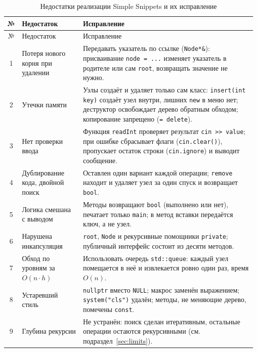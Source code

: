 \documentclass[otchet]{SCWorks}
\begin{document}
\begin{longtable}{|c|p{}|p{}|}
  \caption{Недостатки реализации Simple Snippets и их исправление}
  \label{tab:fixes} \\
  \hline
  № & Недостаток & Исправление \\ \hline
  \endfirsthead
  \hline
  № & Недостаток & Исправление \\ \hline
  \endhead
  1 & Потеря нового корня при удалении &
      Передавать указатель по ссылке (\texttt{Node*\&}): присваивание
      \texttt{node = ...} изменяет указатель в родителе или сам
      \texttt{root}, возвращать значение не нужно. \\ \hline
  2 & Утечки памяти &
      Узлы создаёт и удаляет только сам класс: \texttt{insert(int key)}
      создаёт узел внутри, лишних \texttt{new} в меню нет; деструктор
      освобождает дерево обратным обходом; копирование запрещено
      (\texttt{= delete}). \\ \hline
  3 & Нет проверки ввода &
      Функция \texttt{readInt} проверяет результат \texttt{cin >{}> value};
      при ошибке сбрасывает флаги (\texttt{cin.clear()}), пропускает
      остаток строки (\texttt{cin.ignore}) и выводит сообщение. \\ \hline
  4 & Дублирование кода, двойной поиск &
      Оставлен один вариант каждой операции; \texttt{remove} находит и
      удаляет узел за один спуск и возвращает \texttt{bool}. \\ \hline
  5 & Логика смешана с выводом &
      Методы возвращают \texttt{bool} (выполнено или нет), печатает
      только \texttt{main}; в метод вставки передаётся ключ, а не узел. \\ \hline
  6 & Нарушена инкапсуляция &
      \texttt{root}, \texttt{Node} и рекурсивные помощники
      \texttt{private}; публичный интерфейс состоит из десяти методов. \\ \hline
  7 & Обход по уровням за $O(n\cdot h)$ &
      Использовать очередь \texttt{std::queue}: каждый узел помещается в
      неё и извлекается ровно один раз, время $O(n)$. \\ \hline
  8 & Устаревший стиль &
      \texttt{nullptr} вместо \texttt{NULL}; макрос заменён выражением;
      \texttt{system("cls")} удалён; методы, не меняющие дерево, помечены
      \texttt{const}. \\ \hline
  9 & Глубина рекурсии &
      Не устранён: поиск сделан итеративным, остальные операции остаются
      рекурсивными (см. подраздел~\ref{sec:limits}). \\ \hline
\end{longtable}
\end{document}
